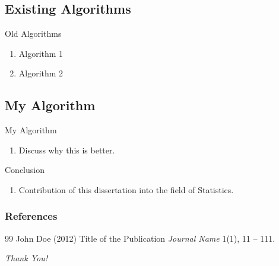 \documentclass[10pt,compress]{beamer}
\begin{document}
\subsection{Existing Algorithms}

\begin{frame}{Old Algorithms}
\begin{enumerate}
\item Algorithm 1
\item Algorithm 2
\end{enumerate}
\end{frame}

\subsection{My Algorithm}

\begin{frame}{My Algorithm}
\begin{enumerate}
\item Discuss why this is better.
\end{enumerate}
\end{frame}


\begin{frame}{Conclusion}
\begin{enumerate}
\item Contribution of this dissertation into the field of Statistics.
\end{enumerate}
\end{frame}



\begin{frame}
\frametitle{References}
\footnotesize{
\begin{thebibliography}{99} %
 John Doe (2012)
\newblock Title of the Publication
\newblock \emph{Journal Name} 1(1), 11 -- 111.
\end{thebibliography}
}
\end{frame}


\begin{frame}{}
  \centering \Huge
  \emph{Thank You!}
\end{frame}

\end{document}
